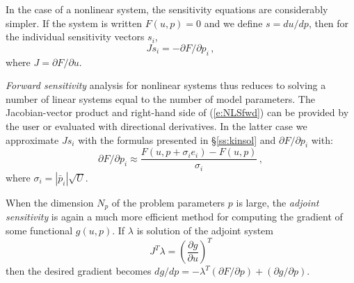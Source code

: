 In the case of a nonlinear system, the sensitivity equations are
considerably simpler.  If the system is written $F(u,p) = 0$ and we
define $s = d u / d p$, then for the individual sensitivity vectors $s_i$,
\begin{equation}\label{e:NLSfwd}
  J s_i = -\partial F / \partial p_i \, ,
\end{equation}
where $ J = \partial F / \partial u$. 

{\em Forward sensitivity} analysis for nonlinear systems thus reduces to solving a 
number of linear systems equal to the number of model parameters. 
The Jacobian-vector product and right-hand side of (\ref{e:NLSfwd}) can be provided 
by the user or evaluated with directional derivatives. In the latter case
we approximate $J s_i$ with the formulas presented in \S\ref{ss:kinsol} 
and ${\partial F}/{\partial p_i}$ with:
\begin{equation*}
{\partial F}/{\partial p_i} \approx \frac{F(u,p + \sigma_i e_i)-
    F(u,p)}{\sigma_i} \, ,
\end{equation*}
where $\sigma_i = |{\bar p}_i| \sqrt{U}$.

When the dimension $N_p$ of the problem parameters $p$ is large, the 
{\em adjoint sensitivity} is again a much more efficient method for computing 
the gradient of some functional $g(u,p)$. If $\lambda$ is solution of
the adjoint system
\begin{equation}\label{e:NLSadj}
  J^T \lambda = \left( \frac{\partial g}{\partial u} \right)^T
\end{equation}
then the desired gradient becomes
${dg}/{dp} = -\lambda^T ({\partial F}/{\partial p}) + ({\partial g}/{\partial p})$.
